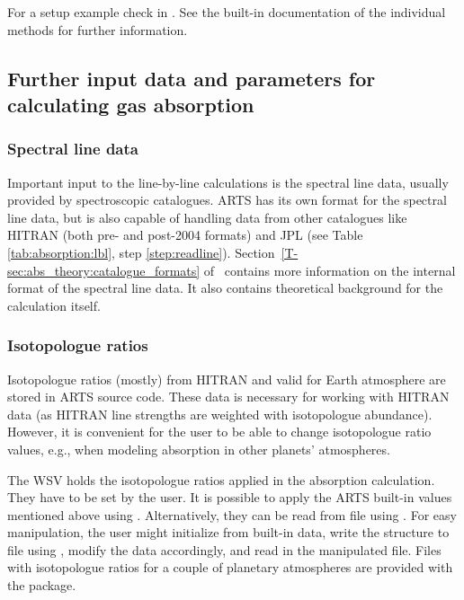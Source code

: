 For a setup example check  in
. See the built-in
documentation of the individual methods for further information.


\subsection{Further input data and parameters for calculating gas absorption}
\label{sec:absorption:input}

\subsubsection{Spectral line data}
\label{sec:absorption:linecat}

Important input to the line-by-line calculations is the spectral line data,
usually provided by spectroscopic catalogues. ARTS has its own format for the
spectral line data, but is also capable of handling data from other catalogues
like HITRAN (both pre- and post-2004 formats) and JPL (see Table
\ref{tab:absorption:lbl}, step \ref{step:readline}).
Section~\ref{T-sec:abs_theory:catalogue_formats} of \theory\ contains more
information on the internal format of the spectral line data.  It also contains
theoretical background for the calculation itself.

\subsubsection{Isotopologue ratios}
\label{sec:absorption:isoratio}

Isotopologue ratios (mostly) from HITRAN and valid for Earth atmosphere are
stored in ARTS source code. These data is necessary for working with HITRAN data
(as HITRAN line strengths are weighted with isotopologue abundance). However,
it is convenient for the user to be able to change isotopologue ratio values,
e.g., when modeling absorption in other planets' atmospheres.

The WSV  holds the isotopologue ratios applied in
the absorption calculation. They have to be set by the user. It is possible to
apply the ARTS built-in values mentioned above using
. Alternatively, they can be read
from file using . For easy manipulation, the user might
initialize  from built-in data, write the
 structure to file using ,
modify the data accordingly, and read in the manipulated file.
Files with isotopologue ratios for a couple of planetary atmospheres are
provided with the  package.


